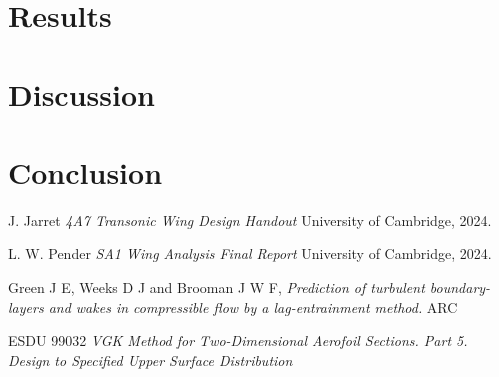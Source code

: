 \documentclass{article}
\begin{document}



\section{Results}

\section{Discussion}

\section{Conclusion}


\begin{thebibliography}{9}

    J. Jarret
    \emph{4A7 Transonic Wing Design Handout}
    University of Cambridge,
    2024.

    L. W. Pender
    \emph{SA1 Wing Analysis Final Report}
    University of Cambridge,
    2024.

    Green J E, Weeks D J and Brooman J W F,
    \emph{Prediction of turbulent boundary-layers and wakes in compressible flow by a lag-entrainment method.}
    ARC

    ESDU 99032
    \emph{VGK Method for Two-Dimensional Aerofoil Sections. Part 5. Design to Specified Upper Surface Distribution}
  
\end{thebibliography}
\end{document}
